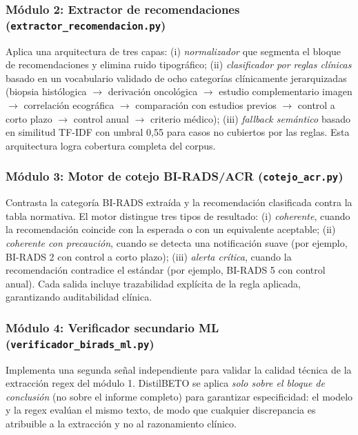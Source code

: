 \documentclass[10pt,journal,a4paper]{IEEEtran}
\newcommand{\codename}[1]{\texttt{#1}}
\begin{document}
\subsubsection{M\'odulo 2: Extractor de recomendaciones (\codename{extractor\_recomendacion.py})}
Aplica una arquitectura de tres capas: (i) \emph{normalizador} que segmenta el bloque de recomendaciones y elimina ruido tipogr\'afico; (ii) \emph{clasificador por reglas cl\'inicas} basado en un vocabulario validado de ocho categor\'ias cl\'inicamente jerarquizadas (biopsia hist\'ologica $\rightarrow$ derivaci\'on oncol\'ogica $\rightarrow$ estudio complementario imagen $\rightarrow$ correlaci\'on ecogr\'afica $\rightarrow$ comparaci\'on con estudios previos $\rightarrow$ control a corto plazo $\rightarrow$ control anual $\rightarrow$ criterio m\'edico); (iii) \emph{fallback sem\'antico} basado en similitud TF-IDF con umbral 0,55 para casos no cubiertos por las reglas. Esta arquitectura logra cobertura completa del corpus.

\subsubsection{M\'odulo 3: Motor de cotejo BI-RADS/ACR (\codename{cotejo\_acr.py})}
Contrasta la categor\'ia BI-RADS extra\'ida y la recomendaci\'on clasificada contra la tabla normativa. El motor distingue tres tipos de resultado: (i) \emph{coherente}, cuando la recomendaci\'on coincide con la esperada o con un equivalente aceptable; (ii) \emph{coherente con precauci\'on}, cuando se detecta una notificaci\'on suave (por ejemplo, BI-RADS 2 con control a corto plazo); (iii) \emph{alerta cr\'itica}, cuando la recomendaci\'on contradice el est\'andar (por ejemplo, BI-RADS 5 con control anual). Cada salida incluye trazabilidad expl\'icita de la regla aplicada, garantizando auditabilidad cl\'inica.

\subsubsection{M\'odulo 4: Verificador secundario ML (\codename{verificador\_birads\_ml.py})}
Implementa una segunda se\~nal independiente para validar la calidad t\'ecnica de la extracci\'on regex del m\'odulo 1. DistilBETO se aplica \emph{solo sobre el bloque de conclusi\'on} (no sobre el informe completo) para garantizar especificidad: el modelo y la regex eval\'uan el mismo texto, de modo que cualquier discrepancia es atribuible a la extracci\'on y no al razonamiento cl\'inico.
\end{document}
